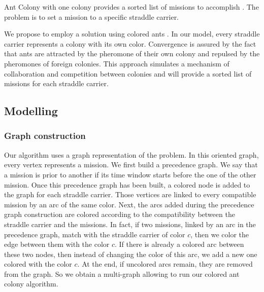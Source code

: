 \documentclass[journal]{IEEEtran}
\begin{document}
Ant Colony with one colony provides a sorted list of missions to accomplish \cite{Montemanni04,Bullnheimer97,Bullnheimer99}. The problem is to set a
mission to a specific straddle carrier.

We propose to employ a solution using colored ants \cite{Bertelle02}. In our model, every straddle carrier represents a colony with
its own color. Convergence is assured by the fact that ants are attracted by the
pheromone of their own colony and repulsed by the pheromones of foreign
colonies. This approach simulates a mechanism of collaboration and competition
between colonies and will provide a sorted list of missions for each straddle
carrier.

\subsection{Modelling}

\subsubsection{Graph construction}
\medskip
Our algorithm uses a graph representation of the problem. In this oriented graph, every vertex represents a mission. We first build a precedence graph. We say that a mission is prior to another if its time window starts before the one of the other mission. Once this precedence graph has been built, a colored node is added to the graph for each straddle carrier. Those vertices are linked to every compatible mission by an arc of the same color. Next, the arcs added during the precedence graph construction are colored according to the compatibility
between the straddle carrier and the missions. In fact, if two missions, linked
by an arc in the precedence graph, match with the straddle carrier of color $c$,
then we color the edge between them with the color $c$. If there is already a
colored arc between these two nodes, then instead of changing the color of this
arc, we add a new one colored with the color $c$. At the end, if uncolored arcs
remain, they are removed from the graph. So we obtain a multi-graph allowing to
run our colored ant colony algorithm.\\
\end{document}
